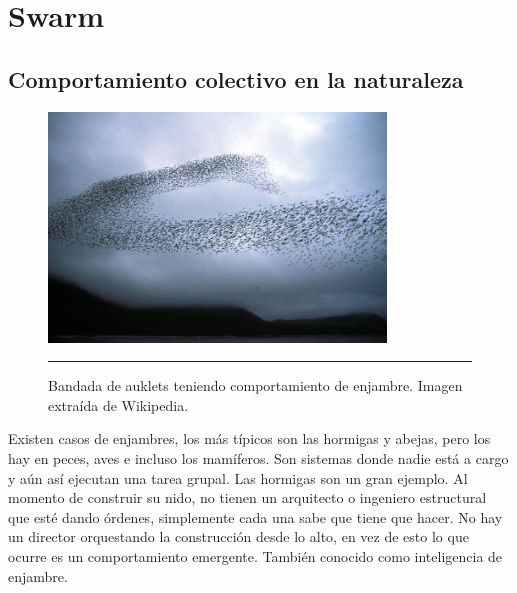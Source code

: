 
\chapter{Swarm} %

\label{Chapter2} %



\section{Comportamiento colectivo en la naturaleza}

\begin{figure}[htbp]
	\centering
		\includegraphics[width=0.8\textwidth]{./Figures/swarm.jpg}
		\rule{35em}{0.5pt}
	\caption[Bandada de auklets]{Bandada de auklets teniendo comportamiento de enjambre. Imagen extraída de Wikipedia.}
	\label{fig:Bandada}
\end{figure}

Existen casos de enjambres, los más típicos son las hormigas y abejas, pero los hay en peces, aves e incluso los mamíferos. Son sistemas donde nadie está a cargo y aún así ejecutan una tarea grupal. Las hormigas son un gran ejemplo. Al momento de construir su nido, no tienen un arquitecto o ingeniero estructural que esté dando órdenes, simplemente cada una sabe que tiene que hacer. No hay un director orquestando la construcción desde lo alto, en vez de esto lo que ocurre es un comportamiento emergente. También conocido como inteligencia de enjambre.


